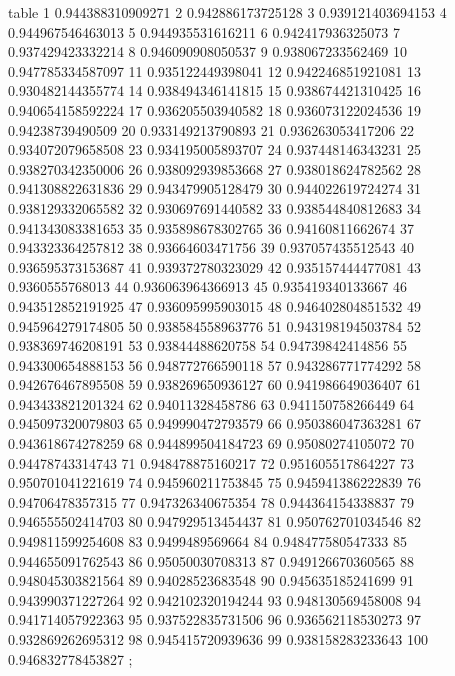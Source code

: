 \nextgroupplot[title=Seed 10,
height=\figheight,
legend cell align={left},
legend columns=-1,
legend style={
  nodes={scale=0.85},
  fill opacity=0.8,
  draw opacity=1,
  text opacity=1,
  at={(-0.20,1.36)},%
  anchor=south west,
  draw=white!80!black
},
minor xtick={25, 75},
minor ytick={},
tick align=outside,
tick pos=left,
width=\figwidth,
x grid style={white!69.0196078431373!black},
xlabel={Eval. Steps},
xminorgrids,
xmajorgrids,
xmin=-3.95, xmax=104.95,
xtick style={color=black},
xtick={-25,0,50,100,125},
xticklabels={-25,0,50,100,125},
y grid style={white!69.0196078431373!black},
ylabel={ACC (\%)},
ymajorgrids,
ymin=0.895982454991159, ymax=0.960314079751296,
ytick style={color=black},
ytick={0.89,0.9,0.91,0.92,0.93,0.94,0.95,0.96,0.97},
yticklabels={89,90,91,92,93,94,95,96,97}
]
table {%
	1 0.944388310909271
	2 0.942886173725128
	3 0.939121403694153
	4 0.944967546463013
	5 0.944935531616211
	6 0.942417936325073
	7 0.937429423332214
	8 0.946090908050537
	9 0.938067233562469
	10 0.947785334587097
	11 0.935122449398041
	12 0.942246851921081
	13 0.930482144355774
	14 0.938494346141815
	15 0.938674421310425
	16 0.940654158592224
	17 0.936205503940582
	18 0.936073122024536
	19 0.94238739490509
	20 0.933149213790893
	21 0.936263053417206
	22 0.934072079658508
	23 0.934195005893707
	24 0.937448146343231
	25 0.938270342350006
	26 0.938092939853668
	27 0.938018624782562
	28 0.941308822631836
	29 0.943479905128479
	30 0.944022619724274
	31 0.938129332065582
	32 0.930697691440582
	33 0.938544840812683
	34 0.941343083381653
	35 0.935898678302765
	36 0.94160811662674
	37 0.943323364257812
	38 0.93664603471756
	39 0.937057435512543
	40 0.936595373153687
	41 0.939372780323029
	42 0.935157444477081
	43 0.9360555768013
	44 0.936063964366913
	45 0.935419340133667
	46 0.943512852191925
	47 0.936095995903015
	48 0.946402804851532
	49 0.945964279174805
	50 0.938584558963776
	51 0.943198194503784
	52 0.938369746208191
	53 0.93844488620758
	54 0.94739842414856
	55 0.943300654888153
	56 0.948772766590118
	57 0.943286771774292
	58 0.942676467895508
	59 0.938269650936127
	60 0.941986649036407
	61 0.943433821201324
	62 0.94011328458786
	63 0.941150758266449
	64 0.945097320079803
	65 0.949990472793579
	66 0.950386047363281
	67 0.943618674278259
	68 0.944899504184723
	69 0.95080274105072
	70 0.94478743314743
	71 0.948478875160217
	72 0.951605517864227
	73 0.950701041221619
	74 0.945960211753845
	75 0.945941386222839
	76 0.94706478357315
	77 0.947326340675354
	78 0.944364154338837
	79 0.946555502414703
	80 0.947929513454437
	81 0.950762701034546
	82 0.949811599254608
	83 0.9499489569664
	84 0.948477580547333
	85 0.944655091762543
	86 0.95050030708313
	87 0.949126670360565
	88 0.948045303821564
	89 0.94028523683548
	90 0.945635185241699
	91 0.943990371227264
	92 0.942102320194244
	93 0.948130569458008
	94 0.941714057922363
	95 0.937522835731506
	96 0.936562118530273
	97 0.932869262695312
	98 0.945415720939636
	99 0.938158283233643
	100 0.946832778453827
};

